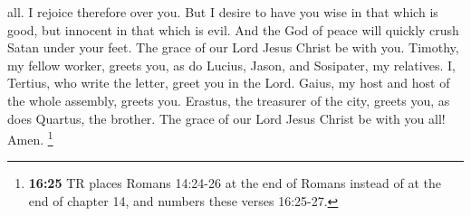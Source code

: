 \begin{paracol}{2}
\begin{otherlanguage}{english}
all. I rejoice therefore over you. But I desire to have you wise in that
which is good, but innocent in that which is evil.  And
the God of peace will quickly crush Satan under your feet. The grace of
our Lord Jesus Christ be with you.  Timothy, my fellow
worker, greets you, as do Lucius, Jason, and Sosipater, my relatives.
 I, Tertius, who write the letter, greet you in the Lord.
 Gaius, my host and host of the whole assembly, greets
you. Erastus, the treasurer of the city, greets you, as does Quartus,
the brother.  The grace of our Lord Jesus Christ be with
you all! Amen.  \footnote{\textbf{16:25} TR places Romans
  14:24-26 at the end of Romans instead of at the end of chapter 14, and
  numbers these verses 16:25-27.} \end{otherlanguage}
\end{paracol}
